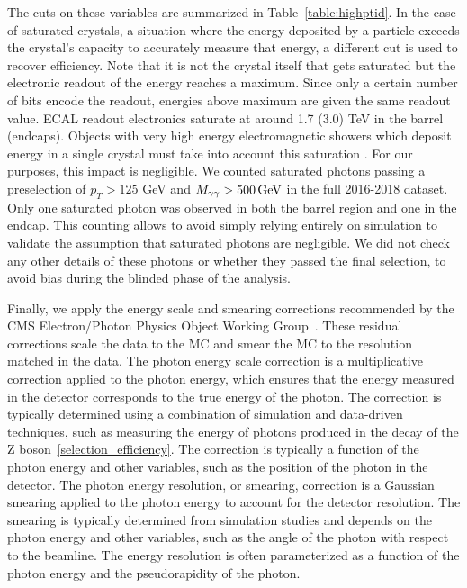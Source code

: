 The cuts on these variables are summarized in Table~\ref{table:highptid}. In the case of saturated crystals, a situation where the energy deposited by a particle exceeds the crystal's capacity to accurately measure that energy, a different \sieie cut is used to recover efficiency. Note that it is not the crystal itself that gets saturated but the electronic readout of the energy reaches a maximum. Since only a certain number of bits encode the readout, energies above maximum are given the same readout value. ECAL readout electronics saturate at around 1.7 (3.0) TeV in the barrel (endcaps). Objects with very high energy electromagnetic showers which deposit energy in a single crystal must take into account this saturation \cite{saturation_readout, Clerbaux:2006kp}. For our purposes, this impact is negligible. We counted saturated photons passing a preselection of $p_{T} > 125$ GeV and $M_{\gamma\gamma} > 500\,\text{Ge\hspace{-.08em}V}$ in the full 2016-2018 dataset. Only one saturated photon was observed in both the barrel region and one in the endcap. This counting allows to avoid simply relying entirely on simulation to validate the assumption that saturated photons are negligible. We did not check any other details of these photons or whether they passed the final selection, to avoid bias during the blinded phase of the analysis. 

Finally, we apply the energy scale and smearing corrections recommended by the CMS Electron/Photon Physics Object Working Group~\cite{EGM_twiki}. These residual corrections scale the data to the MC and smear the MC to the resolution matched in the data. The photon energy scale correction is a multiplicative correction applied to the photon energy, which ensures that the energy measured in the detector corresponds to the true energy of the photon. The correction is typically determined using a combination of simulation and data-driven techniques, such as measuring the energy of photons produced in the decay of the Z boson~\ref{selection_efficiency}. The correction is typically a function of the photon energy and other variables, such as the position of the photon in the detector. The photon energy resolution, or smearing, correction is a Gaussian smearing applied to the photon energy to account for the detector resolution. The smearing is typically determined from simulation studies and depends on the photon energy and other variables, such as the angle of the photon with respect to the beamline. The energy resolution is often parameterized as a function of the photon energy and the pseudorapidity of the photon.

